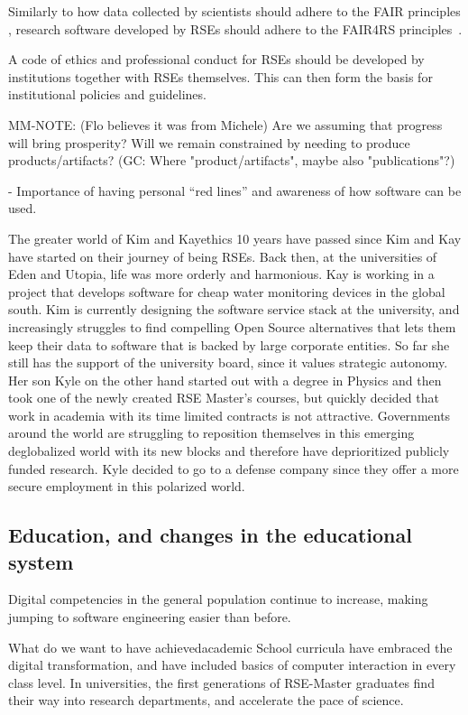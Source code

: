 \documentclass{eceasst}
\begin{document}
Similarly to how data collected by scientists should adhere to the FAIR principles \cite{FAIR}, research software developed by RSEs should adhere to the FAIR4RS principles~\cite{FAIR4RS}.

A code of ethics and professional conduct for RSEs should be developed by institutions together with RSEs themselves.
This can then form the basis for institutional policies and guidelines.

MM-NOTE: (Flo believes it was from Michele) Are we assuming that progress will bring prosperity? Will we remain constrained by needing to produce products/artifacts? (GC: Where "product/artifacts", maybe also "publications"?)

  - Importance of having personal “red lines” and awareness of how software can be used.

\begin{story}{The greater world of Kim and Kay}{ethics}
10 years have passed since Kim and Kay have started on their journey of being RSEs. Back then,
at the universities of Eden and Utopia, life was more orderly and harmonious. Kay is working in a project that develops
software for cheap water monitoring devices in the global south. Kim is currently designing the software service stack
at the university, and increasingly struggles to find compelling Open Source alternatives that lets them keep their data
to software that is backed by large corporate entities. So far she still has the support of the university board, since it values
strategic autonomy.
Her son Kyle on the other hand started out with a degree in Physics and then took one of the newly created RSE Master's courses,
but quickly decided that work in academia with its time limited contracts is not attractive.
Governments around the world are struggling to reposition themselves in this emerging deglobalized world with its new blocks
and therefore have deprioritized publicly funded research. Kyle decided to go to a defense company since they offer a
more secure employment in this polarized world.
\end{story}

\subsection{Education, and changes in the educational system}
Digital competencies in the general population continue to increase, making jumping to software engineering easier than before.

\begin{whatis}{What do we want to have achieved}{academic}
School curricula have embraced the digital transformation, and have included basics of computer interaction
in every class level.
In universities, the first generations of RSE-Master graduates find their way into research departments,
and accelerate the pace of science.
\end{whatis}
\end{document}
